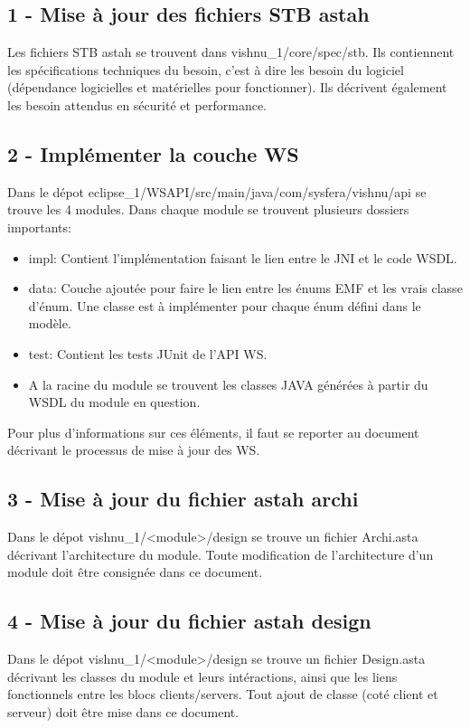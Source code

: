 \documentclass{article}
\begin{document}
\subsection{1 - Mise à jour des fichiers STB astah}
Les fichiers STB astah se trouvent dans vishnu\_1/core/spec/stb. Ils contiennent les spécifications
techniques du besoin, c'est à dire les besoin du logiciel (dépendance logicielles et
matérielles pour fonctionner). Ils décrivent également les besoin attendus en sécurité et 
performance.

\subsection{2 - Implémenter la couche WS}
Dans le dépot eclipse\_1/WSAPI/src/main/java/com/sysfera/vishnu/api se trouve les 4 modules.
Dans chaque module se trouvent plusieurs dossiers importants:
\begin{itemize}
\item impl: Contient l'implémentation faisant le lien entre le JNI et le code WSDL.
\item data: Couche ajoutée pour faire le lien entre les énums EMF et les vrais classe d'énum. Une classe est à implémenter pour chaque énum défini dans le modèle.
\item test: Contient les tests JUnit de l'API WS.
\item A la racine du module se trouvent les classes JAVA générées à partir du WSDL du module en question.
\end{itemize}
Pour plus d'informations sur ces éléments, il faut se reporter au document décrivant le processus de mise à jour des WS.

\subsection{3 - Mise à jour du fichier astah archi}
Dans le dépot vishnu\_1/<module>/design se trouve un fichier Archi.asta décrivant l'architecture du module.
Toute modification de l'architecture d'un module doit être consignée dans ce document.

\subsection{4 - Mise à jour du fichier astah design}
Dans le dépot vishnu\_1/<module>/design se trouve un fichier Design.asta décrivant les classes du module
et leurs intéractions, ainsi que les liens fonctionnels entre les blocs clients/servers.
Tout ajout de classe (coté client et serveur) doit être mise dans ce document.
\end{document}
